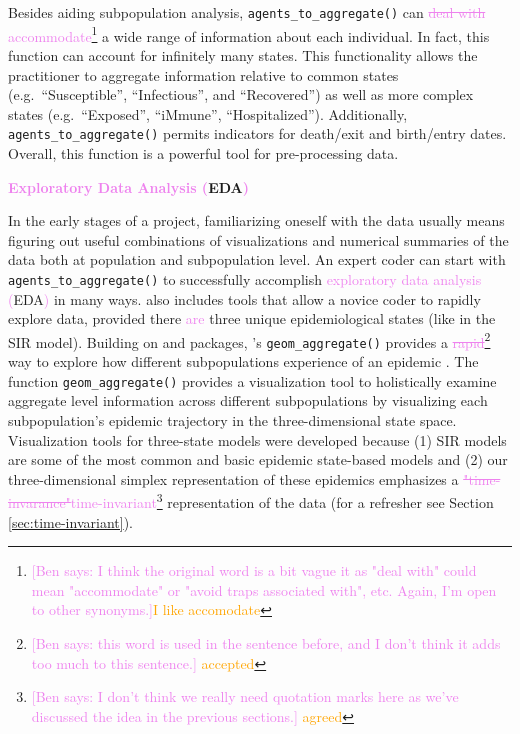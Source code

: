 \documentclass[
  shortnames]{jss}
\begin{document}
Besides aiding subpopulation analysis, \texttt{agents\_to\_aggregate()}
can
\textcolor{violet}{\sout{deal with} accommodate}\footnote{\textcolor{violet}{[Ben says: I think the original word is a bit vague it as "deal with" could mean "accommodate" or "avoid traps associated with", etc. Again, I'm open to other synonyms.]}\textcolor{orange}{I like accomodate}}
a wide range of information about each individual. In fact, this
function can account for infinitely many states. This functionality
allows the practitioner to aggregate information relative to common
states (e.g.~``Susceptible'', ``Infectious'', and ``Recovered'') as well
as more complex states (e.g.~``Exposed'', ``iMmune'', ``Hospitalized'').
Additionally, \texttt{agents\_to\_aggregate()} permits indicators for
death/exit and birth/entry dates. Overall, this function is a powerful
tool for pre-processing data.

\textbf{\textcolor{violet}{Exploratory Data Analysis (}EDA\textcolor{violet}{)}}

In the early stages of a project, familiarizing oneself with the data
usually means figuring out useful combinations of visualizations and
numerical summaries of the data both at population and subpopulation
level. An expert coder can start with \texttt{agents\_to\_aggregate()}
to successfully accomplish
\textcolor{violet}{exploratory data analysis (}EDA\textcolor{violet}{)}
in many ways.  also includes tools that allow a novice
coder to rapidly explore data, provided there \textcolor{violet}{are}
three unique epidemiological states (like in the SIR model). Building on
 and  packages, 's
\texttt{geom\_aggregate()} provides a
\textcolor{violet}{\sout{rapid}}\footnote{\textcolor{violet}{[Ben says: this word is used in the sentence before, and I don't think it adds too much to this sentence.]} \textcolor{orange}{accepted}}
way to explore how different subpopulations experience of an epidemic
\citep{Wickham2016, Hamilton2018}. The function
\texttt{geom\_aggregate()} provides a visualization tool to holistically
examine aggregate level information across different subpopulations by
visualizing each subpopulation's epidemic trajectory in the
three-dimensional state space. Visualization tools for three-state
models were developed because (1) SIR models are some of the most common
and basic epidemic state-based models and (2) our three-dimensional
simplex representation of these epidemics emphasizes a
\textcolor{violet}{\sout{"time-invarance"}time-invariant}\footnote{\textcolor{violet}{[Ben says: I don't think we really need quotation marks here as we've discussed the idea in the previous sections.]} \textcolor{orange}{agreed}}
representation of the data (for a refresher see Section
\ref{sec:time-invariant}).
\end{document}
